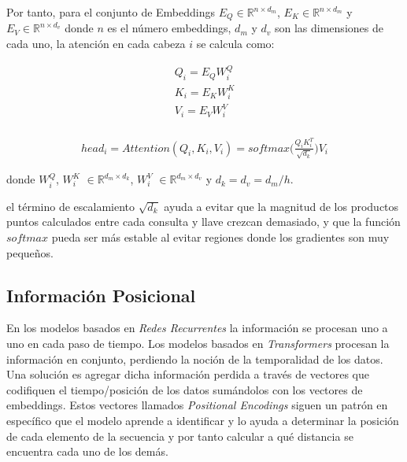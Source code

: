 Por tanto, para el conjunto de Embeddings  $E_Q \in \mathbb{R}^{n \times d_m}$,
$E_K \in \mathbb{R}^{n \times d_m}$ y $E_V \in \mathbb{R}^{n \times d_v}$ donde $n$ es el número
embeddings, $d_m$ y $d_v$ son las dimensiones de cada uno, la atención en cada cabeza $i$ se calcula
como:

\begin{equation}
    \begin{split}
        Q_i = E_Q W_i^Q\\
        K_i = E_K W_i^K\\
        V_i = E_V W_i^V\\
    \end{split}
\end{equation}

\begin{equation}
\begin{split}
    head_i = Attention(Q_i, K_i, V_i) = softmax\Big(\frac{Q_i K_i^T}{\sqrt{d_k}}\Big) V_i
    \label{eq:trans_att}
\end{split}
\end{equation}

\noindent donde $W_i^Q$, $W_i^K$ $\in \mathbb{R}^{d_m \times d_k}$, $W_i^V$ $\in \mathbb{R}^{d_m \times d_v}$
y $d_k=d_v=d_m/h$.

el término de escalamiento $\sqrt{d_k}$ ayuda a evitar que la magnitud de los productos puntos calculados
entre cada consulta y llave crezcan demasiado, y que la función $softmax$ pueda ser más estable al evitar
regiones donde los gradientes son muy pequeños\cite{Vaswani}.


\subsection{Información Posicional}

En los modelos basados en \textit{Redes Recurrentes} la información se procesan uno a uno en cada paso de
tiempo. Los modelos basados en \textit{Transformers} procesan la información en conjunto, perdiendo
la noción de la temporalidad de los datos. Una solución es agregar dicha información perdida a través
de vectores que codifiquen el tiempo/posición de los datos sumándolos con los vectores de embeddings.
Estos vectores llamados \textit{Positional Encodings} \cite{DBLP:journals/corr/GehringAGYD17} siguen
un patrón en específico
que el modelo aprende a identificar y lo ayuda a determinar la posición de cada elemento de la secuencia
y por tanto calcular a qué distancia se encuentra cada uno de los demás.

